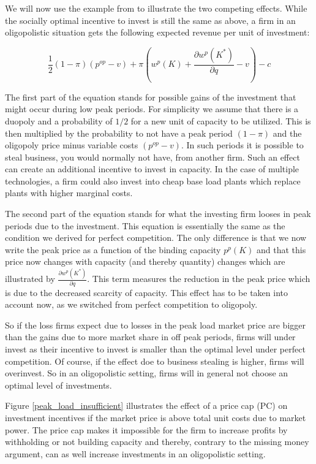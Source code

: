 We will now use the example from \cite{Fehr1995} to illustrate the two competing effects.
While the socially optimal incentive to invest is still the same as above, a firm in an oligopolistic situation gets the following expected revenue per unit of investment:

\begin{equation*}
	\frac{1}{2} (1-\pi) (p^{op}-v) + \pi \left(w^p(K)+\frac{\partial w^p(K^*)}{\partial q}-v\right) - c
\end{equation*}

The first part of the equation stands for possible gains of the investment that might occur during low peak periods. For simplicity we assume that there is a duopoly and a probability of $1/2$ for a new unit of capacity to be utilized. This is then multiplied by the probability to not have a peak period $(1-\pi)$ and the oligopoly price minus variable costs $(p^{op}-v)$. In such periods it is possible to steal business, you would normally not have, from another firm. Such an effect can create an additional incentive to invest in capacity. In the case of multiple technologies, a firm could also invest into cheap base load plants which replace plants with higher marginal costs. %

The second part of the equation stands for what the investing firm looses in peak periods due to the investment. This equation is essentially the same as the condition we derived for perfect competition. The only difference is that we now write the peak price as a function of the binding capacity $p^p(K)$ and that this price now changes with capacity (and thereby quantity) changes which are illustrated by $\frac{\partial w^p(K^*)}{\partial q}$. This term measures the reduction in the peak price which is due to the decreased scarcity of capacity. This effect has to be taken into account now, as we switched from perfect competition to oligopoly.

So if the loss firms expect due to losses in the peak load market price are bigger than the gains due to more market share in off peak periods, firms will under invest as their incentive to invest is smaller than the optimal level under perfect competition. Of course, if the effect doe to business stealing is higher, firms will overinvest. So in an oligopolistic setting, firms will in general not choose an optimal level of investments.

Figure \ref{peak_load_insufficient} illustrates the effect of a price cap (PC) on investment incentives if the market price is above total unit costs due to market power. The price cap makes it impossible for the firm to increase profits by withholding or not building capacity and thereby, contrary to the missing money argument, can as well increase investments in an oligopolistic setting.



